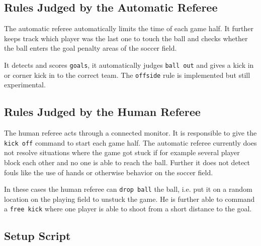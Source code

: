 \subsection{Rules Judged by the Automatic Referee}

The automatic referee automatically limits the time of each game
half. It further keeps track which player was the last one to touch
the ball and checks whether the ball enters the goal penalty areas of
the soccer field. 

It detects and scores \texttt{goals}, it automatically judges
\texttt{ball out} and gives a kick in or corner kick in to the correct team. 
The \texttt{offside} rule is implemented but still experimental.

\subsection{Rules Judged by the Human Referee}

The human referee acts through a connected monitor. It is responsible
to give the \texttt{kick off} command to start each game half. The
automatic referee currently does not resolve situations where the game
got stuck if for example several player block each other and no one is
able to reach the ball. Further it does not detect fouls like the use
of hands or otherwise behavior on the soccer field.

In these cases the human referee can \texttt{drop ball} the ball,
i.e. put it on a random location on the playing field to unstuck the
game. He is further able to command a \texttt{free kick} where one
player is able to shoot from a short distance to the goal.

\subsection{Setup Script}

